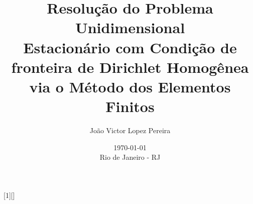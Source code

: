 \usepackage[brazil]{babel}                %
\usepackage[utf8]{inputenc}               %
\usepackage[T1]{fontenc}                  %

\usepackage{graphicx}                     %
\usepackage{float}                        %

\usepackage{tocloft}                      %
\usepackage{hyperref}                     %
\usepackage{csquotes}                     %
\usepackage[backend=biber]{biblatex}      %
\graphicspath{{figures/}}                 %

\usepackage{cancel}
\usepackage[top=1in, bottom=1in, left=0.5in, right=0.5in]{geometry}
\usepackage{amsmath, amssymb}             %
\usepackage{fancyvrb}                     %
\usepackage{upquote}                      %
\usepackage{indentfirst}                  %
\usepackage{listings}                     %
\setlength{\parskip}{\baselineskip}       %
\setlength{\footnotesep}{0.8em}           %
\setlength{\skip\footins}{2em}            %
\setlength{\cftbeforechapskip}{12pt}      %
\setlength{\cftbeforesecskip}{6pt}        %
\setlength{\jot}{10pt}

\title{
  Resolução do Problema Unidimensional \\
  Estacionário com Condição de \\
  fronteira de Dirichlet Homogênea \\
  via o Método dos Elementos Finitos
}

\date{
  \today\\
  \vfill
  Rio de Janeiro - RJ
}

\author{
  João Victor Lopez Pereira
}

[1][]{             %
  \lstset{
    basicstyle=\ttfamily,
    columns=flexible,                      %
    breaklines=true,
    breakatwhitespace=true,
    frame=none,
    basewidth=0.5em,                       %
    aboveskip=13pt,
    belowskip=0pt,
    #1
  }
}{}

